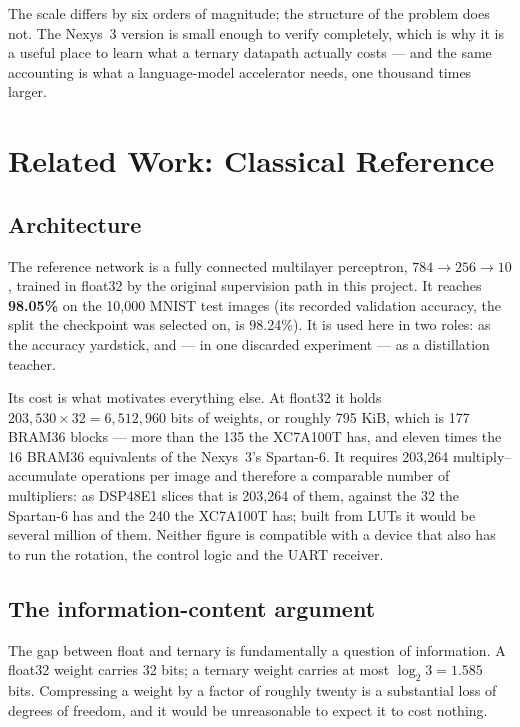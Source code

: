\documentclass[11pt,a4paper]{article}
\begin{document}
The scale differs by six orders of magnitude; the structure of the problem does
not. The Nexys~3 version is small enough to verify completely, which is why it
is a useful place to learn what a ternary datapath actually costs --- and the
same accounting is what a language-model accelerator needs, one thousand times
larger.
\section{Related Work: Classical Reference}
\label{sec:classical}

\subsection{Architecture}

The reference network is a fully connected multilayer perceptron,
$784 \rightarrow 256 \rightarrow 10$, trained in float32 by the original
supervision path in this project. It reaches \textbf{98.05\%} on the 10{,}000
MNIST test images (its recorded validation accuracy, the split the checkpoint was
selected on, is 98.24\%). It is used here in two roles: as the accuracy
yardstick, and --- in one discarded experiment --- as a distillation teacher.

Its cost is what motivates everything else. At float32 it holds
$203{,}530 \times 32 = 6{,}512{,}960$ bits of weights, or roughly 795 KiB, which
is 177 BRAM36 blocks --- more than the 135 the XC7A100T has, and eleven times
the 16 BRAM36 equivalents of the Nexys~3's Spartan-6. It
requires 203{,}264 multiply--accumulate operations per image and therefore a
comparable number of multipliers: as DSP48E1 slices that is 203{,}264 of them,
against the 32 the Spartan-6 has and the 240 the XC7A100T has; built from LUTs
it would be several million of them. Neither figure is compatible with a device
that also has to run the rotation, the control logic and the UART receiver.

\subsection{The information-content argument}

The gap between float and ternary is fundamentally a question of information. A
float32 weight carries 32 bits; a ternary weight carries at most
$\log_2 3 = 1.585$ bits. Compressing a weight by a factor of roughly twenty is
a substantial loss of degrees of freedom, and it would be unreasonable to
expect it to cost nothing.
\end{document}
